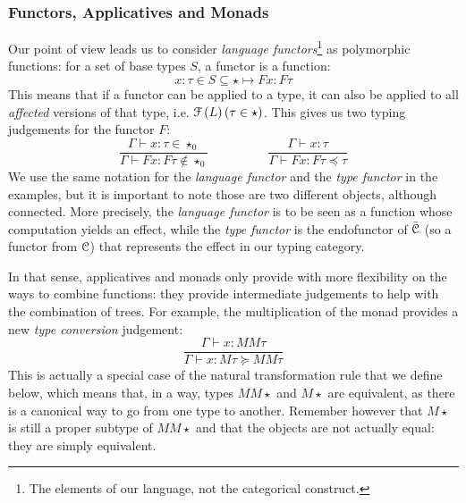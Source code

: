 \subsubsection{Functors, Applicatives and Monads}
\label{subsubsec:functors}
Our point of view leads us to consider \emph{language functors}\footnote{The
	elements of our language, not the categorical construct.} as polymorphic
functions: for a set of base types $S$, a functor is a function:
\begin{equation*}
	x: \tau\in S\subseteq \star \mapsto F x: F\tau
\end{equation*}
This means that if a functor can be applied to a type, it can also be applied
to all \emph{affected} versions of that type, i.e.
$\mathcal{F}\left( L \right)(\tau\in \star)$.
This gives us two typing judgements for the functor $F$:
\begin{equation*}
	\frac{\Gamma\vdash x: \tau \in \star_{0}}{\Gamma\vdash F x: F\tau \notin
		\star_{0}} \hspace{2cm} \frac{\Gamma\vdash x:
		\tau}{\Gamma\vdash Fx : F\tau\preceq \tau}
\end{equation*}
We use the same notation for the \emph{language functor} and the
\emph{type functor} in the examples, but it is important to note those are two
different objects, although connected.
More precisely, the \emph{language functor} is to be seen as a function whose
computation yields an effect, while the \emph{type functor} is the endofunctor
of $\bar{\mathcal{C}}$ (so a functor from $\mathcal{C}$) that represents the effect in our
typing category.

\smallskip

In that sense, applicatives and monads only provide with more flexibility on
the ways to combine functions:
they provide intermediate judgements to help with the combination of trees.
For example, the multiplication of the monad provides a new
\emph{type conversion} judgement:
\begin{equation*}
	\frac{\Gamma\vdash x: MM\tau}{\Gamma\vdash x: M\tau \succeq MM\tau}
\end{equation*}
This is actually a special case of the natural transformation rule that we
define below, which means that, in a way, types $MM\star$ and $M\star$ are
equivalent, as there is a canonical way to go from one type to another.
Remember however that $M\star$ is still a proper subtype of $MM\star$ and that
the objects are not actually equal: they are simply equivalent.

